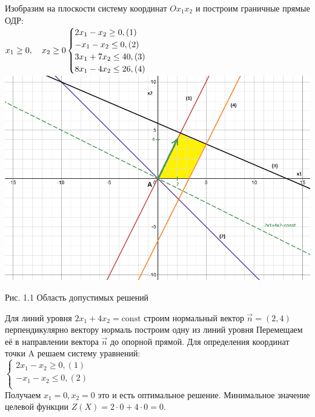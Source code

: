 \documentclass[a4paper, 12pt]{article}
\begin{document}
Изобразим на плоскости систему координат $Ox_1x_2$ и построим граничные прямые ОДР:\\

\begin{math}
  x_1\geq 0, \quad x_2\geq 0\\
  \begin{cases}
    2x_1-x_2 \geq 0,(1)\\
    -x_1-x_2 \leq 0,(2)\\
    3x_1+7x_2 \leq 40,(3)\\
    8x_1-4x_2 \leq 26,(4)\\
  \end{cases}\\
\end{math}\\

\includegraphics[width=\textwidth]{1-1.png}
\begin{center}
  Рис. 1.1 Область допустимых решений
\end{center}

Для линий уровня $2x_1+4x_2 = \text{const}$ строим нормальный вектор $\vec{n} = (2,4)$ перпендикулярно вектору нормаль построим одну из линий уровня Перемещаем её в направлении вектора $\vec{n}$ до опорной прямой. Для определения координат точки A решаем систему уравнений:\\

\begin{math}
  \begin{cases}
    2x_1-x_2 \geq 0,(1)\\
    -x_1-x_2 \leq 0,(2)\\
  \end{cases}
\end{math}\\

Получаем $x_1 = 0, x_2 = 0$ это и есть оптимальное решение. Минимальное значение целевой функции $Z(X) = 2 \cdot 0 + 4 \cdot 0 = 0$.



\end{document}
